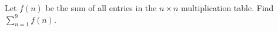 Let $f(n)$ be the sum of all entries in the $n\times n$ multiplication table. Find $\sum_{n=1}^9f(n)$.
